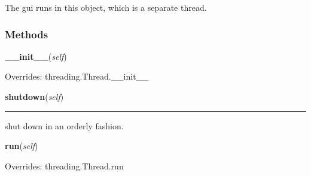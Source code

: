 The gui runs in this object, which is a separate thread.



  \subsubsection{Methods}

    \vspace{0.5ex}

    \begin{boxedminipage}{\textwidth}

    \raggedright \textbf{\_\_init\_\_}(\textit{self})

      Overrides: threading.Thread.\_\_init\_\_

    \end{boxedminipage}

    \label{pyshowall:pyshowall:GuiThread:shutdown}

    \vspace{0.5ex}

    \begin{boxedminipage}{\textwidth}

    \raggedright \textbf{shutdown}(\textit{self})

    \vspace{-1.5ex}

    \rule{\textwidth}{0.5\fboxrule}
    shut down in an orderly fashion.

    \vspace{1ex}

    \end{boxedminipage}

    \vspace{0.5ex}

    \begin{boxedminipage}{\textwidth}

    \raggedright \textbf{run}(\textit{self})

      Overrides: threading.Thread.run

    \end{boxedminipage}

    \label{object:__delattr__}


